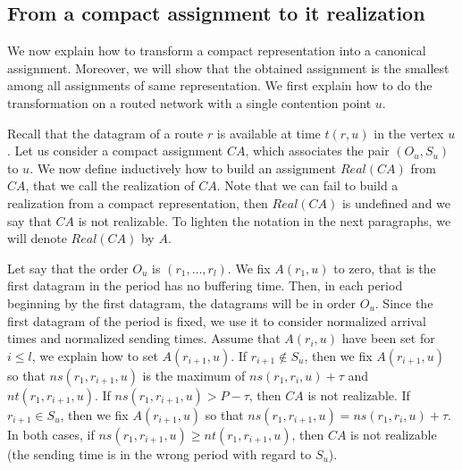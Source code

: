 \documentclass[english]{article}
\begin{document}
\subsection{From a compact assignment to it realization}


We now explain how to transform a compact representation into a canonical assignment.
Moreover, we will show that the obtained assignment is the smallest among all assignments of same representation. We first explain how to do the transformation on a routed network with a single contention point $u$.

Recall that the datagram of a route $r$ is available at time $t(r,u)$ in the vertex $u$.
Let us consider a compact assignment $CA$, which associates the pair $(O_u,S_u)$ to $u$.
We now define inductively how to build an assignment $Real(CA)$ from $CA$, that we call the realization of $CA$. Note that we can fail to build a realization from a compact representation, then $Real(CA)$ is undefined and we say that $CA$ is not realizable. To lighten the notation in the next paragraphs, we will denote $Real(CA)$ by $A$.

Let say that the order $O_u$ is $(r_1, \dots, r_l)$. We fix $A(r_1,u)$ to zero, that is the first
datagram in the period has no buffering time. Then, in each period beginning by the first datagram, the datagrams will be in order $O_u$. Since the first datagram of the period is fixed, we use it to consider normalized arrival times and normalized sending times.
Assume that $A(r_i,u)$ have been set for $i \leq l$, we explain how to 
set $A(r_{i+1},u)$. If $r_{i+1} \notin S_u$, then we fix $A(r_{i+1},u)$ so that $ns(r_1,r_{i+1},u)$ is the maximum of $ns(r_1,r_i,u) + \tau$ and $nt(r_1,r_{i+1},u)$. If $ns(r_1,r_{i+1},u) > P - \tau$, then $CA$ is not realizable. If $r_{i+1} \in S_u$, then we fix $A(r_{i+1},u)$ so that $ns(r_1, r_{i+1},u) = ns(r_1,r_i,u) + \tau$. In both cases, if $ns(r_1, r_{i+1},u) \geq nt(r_1,r_{i+1},u)$, then $CA$ is not realizable (the sending time is in the wrong period with regard to $S_u$). 
\end{document}
